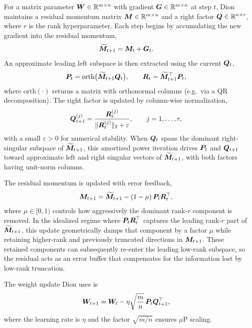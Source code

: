 For a matrix parameter ${\boldsymbol W} \in \mathbb{R}^{m \times n}$ with gradient ${\boldsymbol G} \in \mathbb{R}^{m \times n}$ at step $t$, Dion maintains a residual momentum matrix ${\boldsymbol M} \in \mathbb{R}^{m \times n}$ and a right factor ${\boldsymbol Q} \in \mathbb{R}^{n \times r}$, where $r$ is the rank hyperparameter. Each step begins by accumulating the new gradient into the residual momentum,
\begin{equation*}
  \widetilde{{\boldsymbol M}}_{t+1} = {\boldsymbol M}_t + {\boldsymbol G}_t.
\end{equation*}
An approximate leading left subspace is then extracted using the current ${\boldsymbol Q}_t$,
\begin{equation*}
  {\boldsymbol P}_t = \mathrm{orth}\bigl(\widetilde{{\boldsymbol M}}_{t+1} {\boldsymbol Q}_t\bigr),
  \qquad
  {\boldsymbol R}_t = \widetilde{{\boldsymbol M}}_{t+1}^\top {\boldsymbol P}_t,
\end{equation*}
where $\mathrm{orth}(\cdot)$ returns a matrix with orthonormal columns (e.g.\ via a QR decomposition). The right factor is updated by column-wise normalization,
\begin{equation*}
  {\boldsymbol Q}_{t+1}^{(j)} = \frac{{\boldsymbol R}_t^{(j)}}{\|{\boldsymbol R}_t^{(j)}\|_2 + \varepsilon},
  \qquad j = 1,\dots,r,
\end{equation*}
with a small $\varepsilon > 0$ for numerical stability. When ${\boldsymbol Q}_t$ spans the dominant right-singular subspace of $\widetilde{{\boldsymbol M}}_{t+1}$, this amortized power iteration drives ${\boldsymbol P}_t$ and ${\boldsymbol Q}_{t+1}$ toward approximate left and right singular vectors of $\widetilde{{\boldsymbol M}}_{t+1}$, with both factors having unit-norm columns.

The residual momentum is updated with error feedback,
\begin{equation*}
  {\boldsymbol M}_{t+1} = \widetilde{{\boldsymbol M}}_{t+1} - (1 - \mu)\, {\boldsymbol P}_t {\boldsymbol R}_t^\top,
\end{equation*}
where $\mu \in [0,1)$ controls how aggressively the dominant rank-$r$ component is removed. In the idealized regime where ${\boldsymbol P}_t {\boldsymbol R}_t^\top$ captures the leading rank-$r$ part of $\widetilde{{\boldsymbol M}}_{t+1}$, this update geometrically damps that component by a factor $\mu$ while retaining higher-rank and previously truncated directions in ${\boldsymbol M}_{t+1}$. These retained components can subsequently re-enter the leading low-rank subspace, so the residual acts as an error buffer that compensates for the information lost by low-rank truncation.

The weight update Dion uses is
\begin{equation*}
  {\boldsymbol W}_{t+1}
  = {\boldsymbol W}_t
    - \eta \sqrt{\frac{m}{n}}\, {\boldsymbol P}_t {\boldsymbol Q}_{t+1}^\top,
\end{equation*}
where the learning rate is $\eta$ and the factor $\sqrt{m/n}$ ensures $\mu$P scaling.


